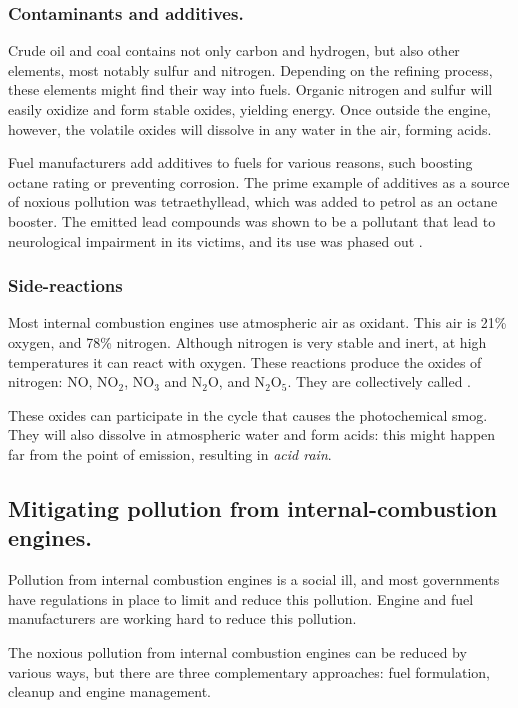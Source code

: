 \subsubsection{Contaminants and additives.}

Crude oil and coal contains not only carbon and hydrogen, but also other
elements, most notably sulfur and nitrogen. Depending on the refining process,
these elements might find their way into fuels. Organic nitrogen and sulfur will
easily oxidize and form stable oxides, yielding energy. Once outside the engine,
however, the volatile oxides will dissolve in any water in the air, forming
acids. \autocite{Duncan2016}

Fuel manufacturers add additives to fuels for various reasons, such boosting
octane rating or preventing corrosion. The prime example of additives as a
source of noxious pollution was tetraethyllead, which was added to petrol as an
octane booster. The emitted lead compounds was shown to be a pollutant that lead
to neurological impairment in its victims, and its use was phased out
\autocite{Needleman2000}.

\subsubsection{Side-reactions}

Most internal combustion engines use atmospheric air as oxidant. This air is
21\% oxygen, and 78\% nitrogen. Although nitrogen is very stable and inert, at
high temperatures it can react with oxygen. These reactions produce the oxides
of nitrogen: NO, NO$_2$, NO$_3$ and N$_2$O, and N$_2$O$_5$. They are
collectively called \nox.

These oxides can participate in the cycle that causes the photochemical smog.
They will also dissolve in atmospheric water and form acids: this might happen
far from the point of emission, resulting in \textit{acid rain}. 

\subsection{Mitigating pollution from internal\hyp{}combustion engines.}
 
Pollution from internal combustion engines is a social ill, and most governments
have regulations in place to limit and reduce this pollution. Engine and fuel
manufacturers are working hard to reduce this pollution.

The noxious pollution from internal combustion engines can be reduced by various
ways, but there are three complementary approaches: fuel formulation, cleanup
and engine management.

